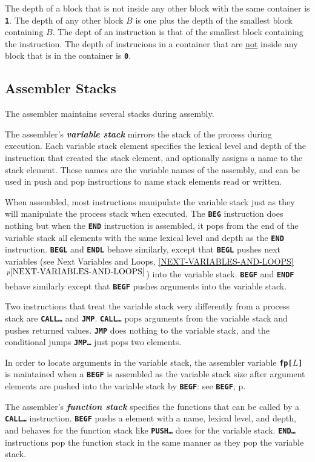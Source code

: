 \documentclass[12pt]{article}
\newcommand{\TT}[1]{{\tt \bfseries #1}}
\newcommand{\key}[1]{{\bf \em #1}\index{#1}}
\newcommand{\itemref}[1]{\ref{#1}$\,^{p\pageref{#1}}$}
\newcommand{\pagref}[1]{p\pageref{#1}}
\begin{document}
The depth of a block that is not inside any other block with
the same container is \TT{1}.  The depth of any other block $B$
is one plus the depth of the smallest block containing $B$.
The dept of an instruction
is that of the smallest block containing the instruction.
The depth of instrucions in a container
that are \underline{not} inside any block that is in the container
is \TT{0}.

\subsection{Assembler Stacks}
\label{ASSEMBLER-STACKS}

The assembler maintains several stacks during assembly.

The assembler's \key{variable stack} mirrors the stack of
the process during execution.  Each variable stack
element specifies the lexical level and depth of the
instruction that created the stack element, and optionally
assigns a name to the stack element.  These names are the
variable names of the assembly, and can be used in
push and pop instructions to name stack elements read or
written.

When assembled, most instructions manipulate the variable
stack just as they will manipulate the process stack
when executed.  The \TT{BEG} instruction does nothing
but when the \TT{END} instruction is assembled, it pops
from the end of the variable stack all elements with
the same lexical level and depth as the \TT{END} instruction.
\TT{BEGL} and \TT{ENDL} behave similarly, except that
\TT{BEGL} pushes next variables (see Next Variables and Loops,
\itemref{NEXT-VARIABLES-AND-LOOPS}) into the variable stack.
\TT{BEGF} and \TT{ENDF} behave similarly except that \TT{BEGF}
pushes arguments into the variable stack.

Two instructions that treat the variable stack very differently
from a process stack are \TT{CALL\ldots} and \TT{JMP}.  \TT{CALL\ldots}
pops arguments from the variable stack and pushes returned values.
\TT{JMP} does nothing to the variable stack, and the conditional
jumps \TT{JMP\ldots} just pops two elements.

In order to locate arguments in the variable stack, the assembler variable
\TT{fp[$L$]} is maintained when a \TT{BEGF} is assembled as the
variable stack size after argument elements are pushed into the
variable stack by \TT{BEGF}: see \TT{BEGF}, \pagref{BEGF}.

The assembler's \key{function stack} specifies the functions that
can be called by a \TT{CALL\ldots} instruction.  \TT{BEGF} pushs
a element with a name, lexical level, and depth, and behaves
for the function stack like \TT{PUSH\ldots} does for the variable stack.
\TT{END\ldots} instructions pop the function stack in the same manner as
they pop the variable stack.
\end{document}
